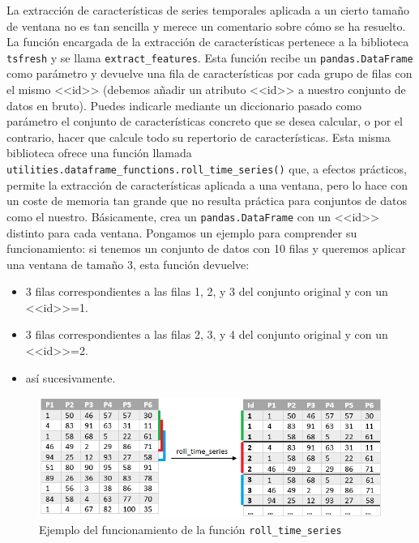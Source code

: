 La extracción de características de series temporales aplicada a un cierto tamaño de ventana no es tan sencilla y merece un comentario sobre cómo se ha resuelto. La función encargada de la extracción de características pertenece a la biblioteca \texttt{tsfresh} y se llama \texttt{extract\_features}. Esta función recibe un \texttt{pandas.DataFrame} como parámetro y devuelve una fila de características por cada grupo de filas con el mismo <<id>> (debemos añadir un atributo <<id>> a nuestro conjunto de datos en bruto). Puedes indicarle mediante un diccionario pasado como parámetro el conjunto de características concreto que se desea calcular, o por el contrario, hacer que calcule todo su repertorio de características. Esta misma biblioteca ofrece una función llamada \texttt{utilities.dataframe\_functions.roll\_time\_series()} que, a efectos prácticos, permite la extracción de características aplicada a una ventana, pero lo hace con un coste de memoria tan grande que no resulta práctica para conjuntos de datos como el nuestro. Básicamente, crea un \texttt{pandas.DataFrame} con un <<id>> distinto para cada ventana. Pongamos un ejemplo para comprender su funcionamiento: si tenemos un conjunto de datos con 10 filas y queremos aplicar una ventana de tamaño 3, esta función devuelve: 
\begin{itemize}
	\item 3 filas correspondientes a las filas 1, 2, y 3 del conjunto original y con un <<id>>=1. 
	\item 3 filas correspondientes a las filas 2, 3, y 4 del conjunto original y con un <<id>>=2. 
	\item así sucesivamente. 
\end{itemize}

\begin{figure}[H]
	\centering
	\includegraphics[width=1\textwidth]{../img/rolltimeseries.png}
	\caption{Ejemplo del funcionamiento de la función \texttt{roll\_time\_series}}
	\label{fig:rolltimeseries}
\end{figure}

